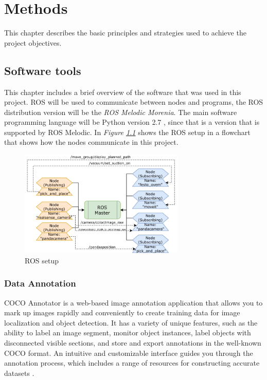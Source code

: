 \chapter{Methods}
This chapter describes the basic principles and strategies used to achieve the project objectives. 
\section{Software tools}

This chapter includes a brief overview of the software that was used in this project. 
ROS will be used to communicate between nodes and programs, the ROS distribution version will be the \textit{ROS Melodic Morenia}\cite{noauthor_melodic_nodate}. 
The main software programming language will be Python version 2.7 \cite{noauthor_python_nodate}, since that is a version that is supported by ROS Melodic.
In \textit{Figure \ref{fig:roswork}} shows the ROS setup in a flowchart that shows how the nodes communicate in this project.
\begin{figure}[h]
    \centering
    \includegraphics[width=0.7\textwidth]{graphics/ros.pdf}
    \caption{ROS setup}
    \label{fig:roswork}
\end{figure}


\subsection{Data Annotation}
COCO Annotator is a web-based image annotation application that allows you to mark up images rapidly and conveniently to create training data for image localization and object detection. It has a variety of unique features, such as the ability to label an image segment, monitor object instances, label objects with disconnected visible sections, and store and export annotations in the well-known COCO format. An intuitive and customizable interface guides you through the annotation process, which includes a range of resources for constructing accurate datasets \cite{brooks_jsbrokscoco-annotator_2021}.

